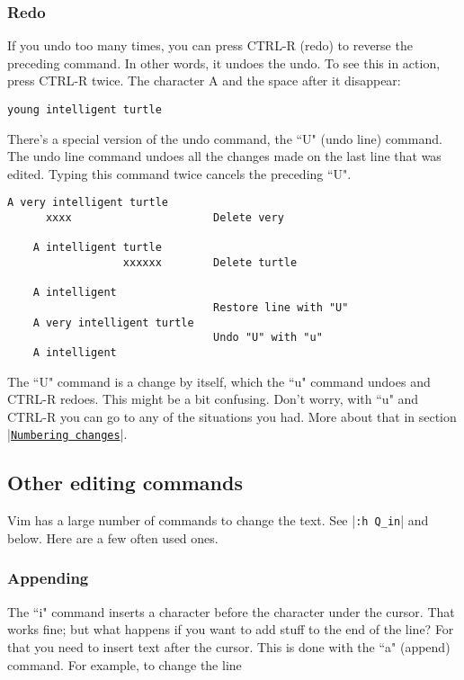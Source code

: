\subsubsection{Redo}

If you undo too many times, you can press CTRL-R (redo) to reverse the preceding command.
In other words, it undoes the undo.
To see this in action, press CTRL-R twice.
The character A and the space after it disappear: 

		\begin{Verbatim}[samepage=true]
    young intelligent turtle 
		\end{Verbatim}

There's a special version of the undo command, the ``U" (undo line) command.
The undo line command undoes all the changes made on the last line that was edited.
Typing this command twice cancels the preceding ``U".

		\begin{Verbatim}[samepage=true]
    A very intelligent turtle 
      xxxx                      Delete very

    A intelligent turtle 
                  xxxxxx        Delete turtle

    A intelligent 
                                Restore line with "U"
    A very intelligent turtle 
                                Undo "U" with "u"
    A intelligent 
		\end{Verbatim}

The ``U" command is a change by itself, which the ``u" command undoes and CTRL-R redoes.
This might be a bit confusing.
Don't worry, with ``u" and CTRL-R you can go to any of the situations you had.
More about that in section |\hyperref[Numbering changes]{\texttt{Numbering changes}}|.

\subsection{Other editing commands}

Vim has a large number of commands to change the text.
See |\texttt{:h Q\_in}| and below.
Here are a few often used ones.

\subsubsection{Appending}

The ``i" command inserts a character before the character under the cursor.
That works fine; but what happens if you want to add stuff to the end of the line?  For that you need to insert text after the cursor.
This is done with the ``a" (append) command.
For example, to change the line 

